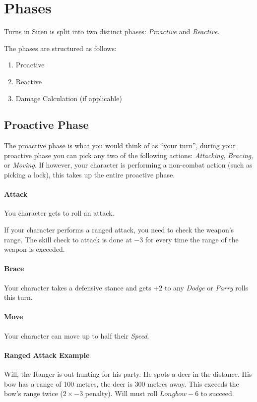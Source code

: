 \section{Phases}\label{sec:phases}
Turns in Siren is split into two distinct phases: \textit{Proactive} and \textit{Reactive}.

The phases are structured as follows:
\begin{enumerate}
  \item Proactive 
  \item Reactive
  \item Damage Calculation (if applicable)
\end{enumerate}

\subsection{Proactive Phase}
The proactive phase is what you would think of as ``your turn'', during your proactive phase you can pick any two of the following actions: \textit{Attacking}, \textit{Bracing}, or \textit{Moving}.
If however, your character is performing a non-combat action (such as picking a lock), this takes up the entire proactive phase.

\paragraph{Attack}
You character gets to roll an attack.

If your character performs a ranged attack, you need to check the weapon's range.
The skill check to attack is done at $-3$ for every time the range of the weapon is exceeded.

\paragraph{Brace}
Your character takes a defensive stance and gets $+2$ to any \textit{Dodge} or \textit{Parry} rolls this turn.

\paragraph{Move}
Your character can move up to half their \textit{Speed}.

\paragraph{Ranged Attack Example} Will, the Ranger is out hunting for his party. He spots a deer in the distance. His bow has a range of 100 metres, the deer is 300 metres away. This exceeds the bow's range twice ($2\times -3$ penalty). Will must roll $Longbow-6$ to succeed.

